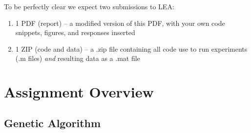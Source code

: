 \documentclass{article}
\begin{document}
To be perfectly clear we expect two submissions to LEA:
\begin{enumerate}
	\item 1 PDF (report) -- a modified version of this PDF, with your own code snippets, figures, and responses inserted
	\item 1 ZIP (code and data)   -- a .zip file containing all code use to run experiments (.m files) \textit{and} resulting data as a .mat file
\end{enumerate}

\newpage

\section{Assignment Overview}
\subsection*{Genetic Algorithm}
\end{document}
